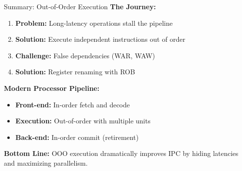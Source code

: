 \documentclass[aspectratio=169,12pt]{beamer}
\begin{document}
\begin{frame}{Summary: Out-of-Order Execution}
    \textbf{The Journey:}
    \begin{enumerate}
        \item \textbf{Problem:} Long-latency operations stall the pipeline
        \item \textbf{Solution:} Execute independent instructions out of order
        \item \textbf{Challenge:} False dependencies (WAR, WAW)
        \item \textbf{Solution:} Register renaming with ROB
    \end{enumerate}

    \vspace{0.5cm}
    \textbf{Modern Processor Pipeline:}
    \begin{itemize}
        \item \textbf{Front-end:} In-order fetch and decode
        \item \textbf{Execution:} Out-of-order with multiple units
        \item \textbf{Back-end:} In-order commit (retirement)
    \end{itemize}

    \vspace{0.5cm}
    \textbf{Bottom Line:} OOO execution dramatically improves IPC by hiding latencies and maximizing parallelism.
\end{frame}
\end{document}
